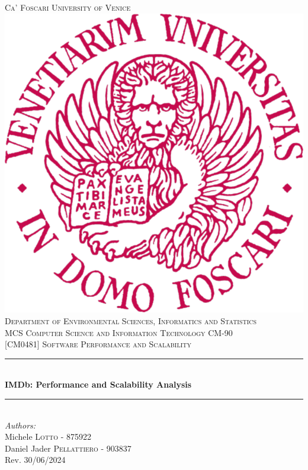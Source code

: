 \documentclass[12pt, twoside]{report}
\begin{document}

	\begin{titlepage}

		\renewcommand{\thesection}{\arabic{section}}
		\newcommand{\HRule}{\rule{\linewidth}{0.2mm}}
		
		\center

		\textsc{\Large Ca' Foscari University of Venice }\\[1.0cm]
		\includegraphics[scale=0.85]{ unive-emblem.png }\\[1cm]
		\textsc{\Large Department of Environmental Sciences, Informatics and Statistics }\\[0.5cm]
		\textsc{\large MCS Computer Science and Information Technology CM-90 }\\[0.5cm]
		\textsc{\large [CM0481] Software Performance and Scalability }\\[0.5cm]
		
		\HRule \\[0.8cm]
		{ \Huge \bfseries IMDb: Performance and Scalability Analysis }\\[0.5cm]
		\HRule \\[0.8cm]
		
		\Large \emph{Authors:}\\
		Michele \textsc{Lotto} - {\normalsize 875922}\\
		Daniel Jader \textsc{Pellattiero} - {\normalsize 903837}\\[3.5cm]

		{\large Rev. 30/06/2024  }\\
		
		\vfill

	\end{titlepage}
\end{document}
